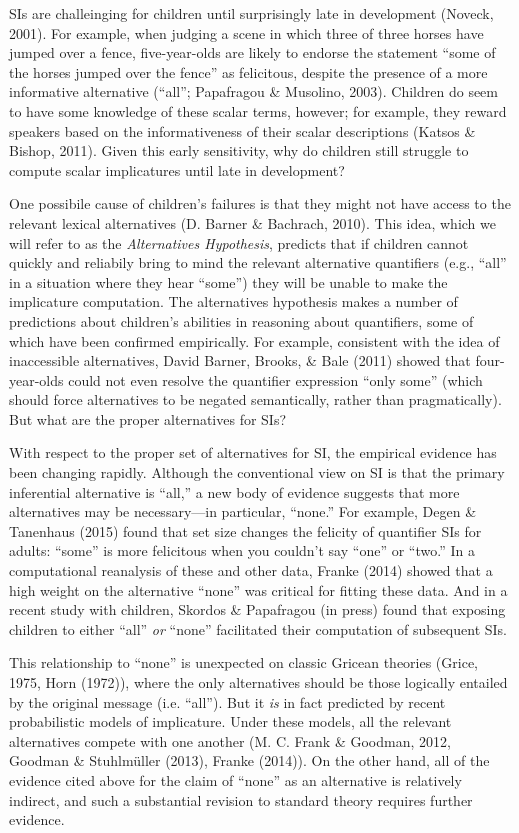 \documentclass[10pt, letterpaper]{article}
\begin{document}
SIs are challeinging for children until surprisingly late in development
(Noveck, 2001). For example, when judging a scene in which three of
three horses have jumped over a fence, five-year-olds are likely to
endorse the statement ``some of the horses jumped over the fence'' as
felicitous, despite the presence of a more informative alternative
(``all''; Papafragou \& Musolino, 2003). Children do seem to have some
knowledge of these scalar terms, however; for example, they reward
speakers based on the informativeness of their scalar descriptions
(Katsos \& Bishop, 2011). Given this early sensitivity, why do children
still struggle to compute scalar implicatures until late in development?

One possibile cause of children's failures is that they might not have
access to the relevant lexical alternatives (D. Barner \& Bachrach,
2010). This idea, which we will refer to as the \emph{Alternatives
Hypothesis}, predicts that if children cannot quickly and reliabily
bring to mind the relevant alternative quantifiers (e.g., ``all'' in a
situation where they hear ``some'') they will be unable to make the
implicature computation. The alternatives hypothesis makes a number of
predictions about children's abilities in reasoning about quantifiers,
some of which have been confirmed empirically. For example, consistent
with the idea of inaccessible alternatives, David Barner, Brooks, \&
Bale (2011) showed that four-year-olds could not even resolve the
quantifier expression ``only some'' (which should force alternatives to
be negated semantically, rather than pragmatically). But what are the
proper alternatives for SIs?

With respect to the proper set of alternatives for SI, the empirical
evidence has been changing rapidly. Although the conventional view on SI
is that the primary inferential alternative is ``all,'' a new body of
evidence suggests that more alternatives may be necessary---in
particular, ``none.'' For example, Degen \& Tanenhaus (2015) found that
set size changes the felicity of quantifier SIs for adults: ``some'' is
more felicitous when you couldn't say ``one'' or ``two.'' In a
computational reanalysis of these and other data, Franke (2014) showed
that a high weight on the alternative ``none'' was critical for fitting
these data. And in a recent study with children, Skordos \& Papafragou
(in press) found that exposing children to either ``all'' \emph{or}
``none'' facilitated their computation of subsequent SIs.

This relationship to ``none'' is unexpected on classic Gricean theories
(Grice, 1975, Horn (1972)), where the only alternatives should be those
logically entailed by the original message (i.e. ``all''). But it
\emph{is} in fact predicted by recent probabilistic models of
implicature. Under these models, all the relevant alternatives compete
with one another (M. C. Frank \& Goodman, 2012, Goodman \& Stuhlm{ü}ller
(2013), Franke (2014)). On the other hand, all of the evidence cited
above for the claim of ``none'' as an alternative is relatively
indirect, and such a substantial revision to standard theory requires
further evidence.
\end{document}
